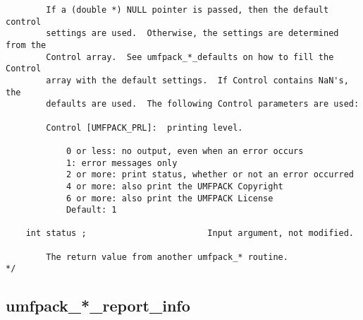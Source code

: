 \documentclass[11pt]{article}
\begin{document}
{\begin{verbatim}
        If a (double *) NULL pointer is passed, then the default control
        settings are used.  Otherwise, the settings are determined from the
        Control array.  See umfpack_*_defaults on how to fill the Control
        array with the default settings.  If Control contains NaN's, the
        defaults are used.  The following Control parameters are used:

        Control [UMFPACK_PRL]:  printing level.

            0 or less: no output, even when an error occurs
            1: error messages only
            2 or more: print status, whether or not an error occurred
            4 or more: also print the UMFPACK Copyright
            6 or more: also print the UMFPACK License
            Default: 1

    int status ;                        Input argument, not modified.

        The return value from another umfpack_* routine.
*/
\end{verbatim}
}

\newpage
\subsection{umfpack\_*\_report\_info}
\end{document}
